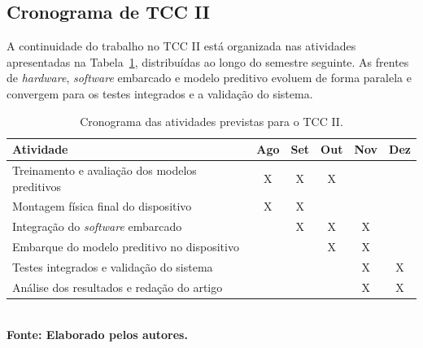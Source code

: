 

\subsection{Cronograma de TCC II}

A continuidade do trabalho no TCC II está organizada nas atividades apresentadas na Tabela~\ref{tableCronograma}, distribuídas ao longo do semestre seguinte. As frentes de \textit{hardware}, \textit{software} embarcado e modelo preditivo evoluem de forma paralela e convergem para os testes integrados e a validação do sistema.

\begin{table}[H]
\centering
\caption{Cronograma das atividades previstas para o TCC II.}
\label{tableCronograma}
\footnotesize
\begin{tabular}{|p{6.5cm}|c|c|c|c|c|}
\hline
\textbf{Atividade} & \textbf{Ago} & \textbf{Set} & \textbf{Out} & \textbf{Nov} & \textbf{Dez} \\
\hline
Treinamento e avaliação dos modelos preditivos & X & X & X &  &  \\
\hline
Montagem física final do dispositivo & X & X &  &  &  \\
\hline
Integração do \textit{software} embarcado &  & X & X & X &  \\
\hline
Embarque do modelo preditivo no dispositivo &  &  & X & X &  \\
\hline
Testes integrados e validação do sistema &  &  &  & X & X \\
\hline
Análise dos resultados e redação do artigo &  &  &  & X & X \\
\hline
\end{tabular}
{\footnotesize\\ \textbf{Fonte: Elaborado pelos autores.}}
\end{table}



